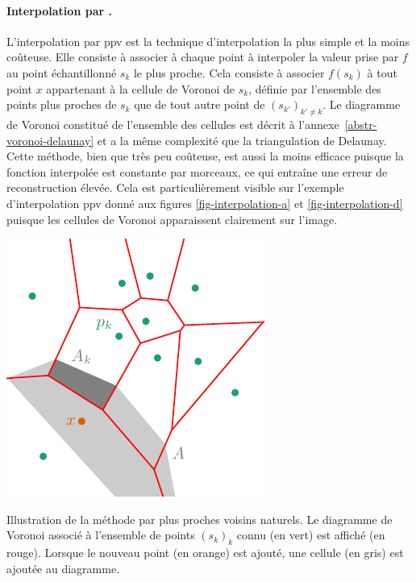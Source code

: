 \paragraph{Interpolation par .} L'interpolation par \gls{ppv} est la technique d'interpolation la plus simple et la moins coûteuse. Elle consiste à associer à chaque point à interpoler la valeur prise par $f$ au point échantillonné $s_{k}$ le plus proche. Cela consiste à associer $f(s_{k})$ à tout point $x$ appartenant à la cellule de Voronoi de $s_{k}$, définie par l'ensemble des points plus proches de $s_k$ que de tout autre point de $(s_{k'})_{k'\neq k}$. Le diagramme de Voronoi constitué de l'ensemble des cellules est décrit à l'annexe~\ref{abstr-voronoi-delaunay} et a la même complexité que la triangulation de Delaunay. Cette méthode, bien que très peu coûteuse, est aussi la moins efficace puisque la fonction interpolée est constante par morceaux, ce qui entraîne une erreur de reconstruction élevée. Cela est particulièrement visible sur l'exemple d'interpolation \gls{ppv} donné aux figures \ref{fig-interpolation-a} et \ref{fig-interpolation-d} puisque les cellules de Voronoi apparaissent clairement sur l'image.
\begin{marginfigure}%
    \centering
    \includegraphics[]{img/chapitre2/figure3/Voronoi_Natural.pdf}
    \caption{Illustration de la méthode par plus proches voisins naturels. Le diagramme de Voronoi associé à l'ensemble de points $(s_k)_k$ connu (en vert) est affiché (en rouge). Lorsque le nouveau point (en orange) est ajouté, une cellule (en gris) est ajoutée au diagramme.}
    \label{fig-natural-weight}
\end{marginfigure}%



